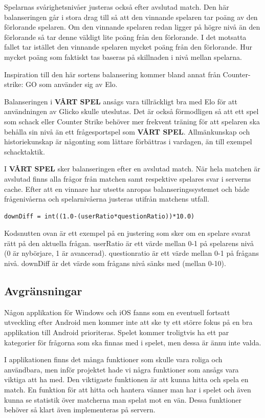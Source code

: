 \documentclass[a4paper, 11pt]{article}
\begin{document}
Spelarnas svårighetsnivåer justeras också efter avslutad match. Den här balanseringen går i stora drag till så att den vinnande spelaren tar poäng av den förlorande spelaren. Om den vinnande spelaren redan ligger på högre nivå än den förlorande så tar denne väldigt lite poäng från den förlorande. I det motsatta fallet tar istället den vinnande spelaren mycket poäng från den förlorande. Hur mycket poäng som faktiskt tas baseras på skillnaden i nivå mellan spelarna. 

Inspiration till den här sortens balansering kommer bland annat från Counter-strike: GO \cite{cs} som använder sig av Elo\cite{elo}. 

Balanseringen i \textbf{VÅRT SPEL} ansågs vara tillräckligt bra med Elo för att användningen av Glicko skulle uteslutas. Det är också förmodligen så att ett spel som schack eller Counter Strike behöver mer frekvent träning för att spelaren ska behålla sin nivå än ett frågesportspel som \textbf{VÅRT SPEL}. Allmänkunskap och historiekunskap är någonting som lättare förbättras i vardagen, än till exempel schacktaktik. 

I \textbf{VÅRT SPEL} sker balanseringen efter en avslutad match. När hela matchen är avslutad finns alla frågor från matchen samt respektive spelares svar i serverns cache. Efter att en vinnare har utsetts anropas balanseringssystemet och både frågenivåerna och spelarnivåerna justeras utifrån matchens utfall.

\begin{verbatim}
downDiff = int((1.0-(userRatio*questionRatio))*10.0)
\end{verbatim}

Kodsnutten ovan är ett exempel på en justering som sker om en spelare svarat rätt på den aktuella frågan. userRatio är ett värde mellan 0-1 på spelarens nivå (0 är nybörjare, 1 är avancerad). questionratio är ett värde mellan 0-1 på frågans nivå. downDiff är det värde som frågans nivå sänks med (mellan 0-10). 

\subsection{Avgränsningar}
Någon applikation för Windows och iOS fanns som en eventuell fortsatt utveckling efter Android men kommer inte att ske ty ett större fokus på en bra applikation till Android prioriteras. Spelet kommer troligtvis ha ett par kategorier för frågorna som ska finnas med i spelet, men dessa är ännu inte valda. 

I applikationen finns det många funktioner som skulle vara roliga och användbara, men inför projektet hade vi några funktioner som ansågs vara viktiga att ha med. Den viktigaste funktionen är att kunna hitta och spela en match. En funktion för att hitta och hantera vänner man har i spelet och även kunna se statistik över matcherna man spelat mot en vän. Dessa funktioner behöver så klart även implementeras på servern.
\end{document}

